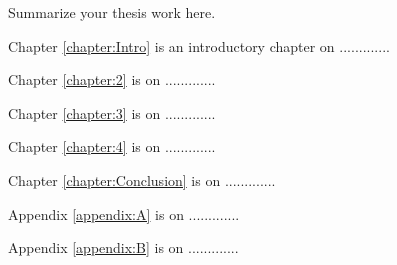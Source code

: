 Summarize your thesis work here.

Chapter \ref{chapter:Intro} is an introductory chapter on .............

Chapter \ref{chapter:2} is on .............

Chapter \ref{chapter:3} is on .............

Chapter \ref{chapter:4} is on .............

Chapter \ref{chapter:Conclusion} is on .............

Appendix \ref{appendix:A} is on .............

Appendix \ref{appendix:B} is on .............

\clearpage
